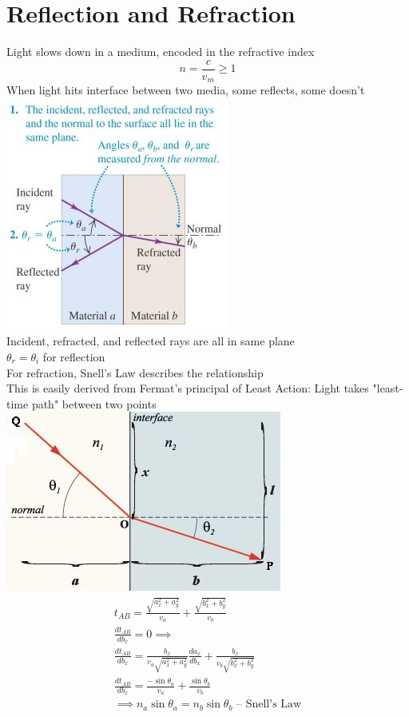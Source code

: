 \documentclass[a4paper, 11pt, fleqn, normalem]{report}
\begin{document}
\section{Reflection and Refraction}
Light slows down in a medium, encoded in the refractive index
\begin{equation*}
    n = \frac{c}{v_{m}} \geq 1
\end{equation*}
When light hits interface between two media, some reflects, some doesn't \\
\includegraphics{Incidence.jpg} \\
Incident, refracted, and reflected rays are all in same plane \\
$\theta_{r} = \theta_{i}$ for reflection \\
For refraction, Snell's Law describes the relationship \\
This is easily derived from Fermat's principal of Least Action: Light takes "least-time path" between two points\\
\includegraphics{Fermat.jpg}
\begin{gather*}
    t_{AB} = \frac{\sqrt{a_{x}^{2} + a_{y}^{2}}}{v_{a}} + \frac{\sqrt{b_{x}^{2} + b_{y}^{2}}}{v_{b}} \\
    \frac{dt_{AB}}{db_{x}} = 0 \implies \\
    \frac{dt_{AB}}{db_{x}} = \frac{b_{x}}{v_{a}\sqrt{a_{x}^{2} + a_{y}^{2}}}\frac{da_{x}}{db_{x}} + \frac{b_{x}}{v_{b}\sqrt{b_{x}^{2} + b_{y}^{2}}} \\
    \frac{dt_{AB}}{db_{x}} = \frac{-\sin{\theta_{a}}}{v_{a}} + \frac{\sin{\theta_{b}}}{v_{b}} \\
    \implies n_{a}\sin{\theta_{a}} = n_{b}\sin{\theta_{b}}\text{ -- Snell's Law}
\end{gather*}
\end{document}
